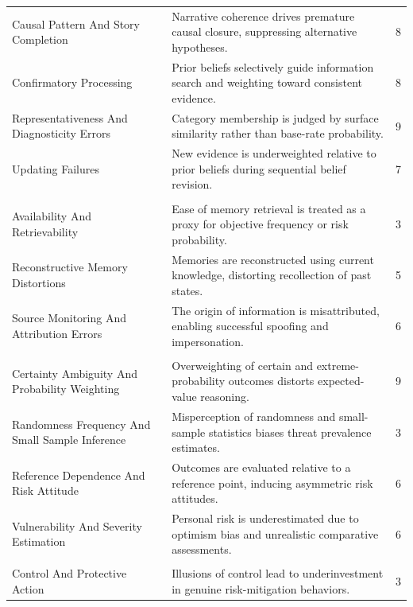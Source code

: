 \begin{longtable}{p{}@{\hspace{20pt}}p{}r}
Causal Pattern And Story Completion & Narrative coherence drives premature causal closure, suppressing alternative hypotheses. & 8 \\
Confirmatory Processing & Prior beliefs selectively guide information search and weighting toward consistent evidence. & 8 \\
Representativeness And Diagnosticity Errors & Category membership is judged by surface similarity rather than base-rate probability. & 9 \\
Updating Failures & New evidence is underweighted relative to prior beliefs during sequential belief revision. & 7 \\
\addlinespace[2pt]\multicolumn{3}{@{}l}{\textbf{Memory \& Source} ($n_{\mathrm{clusters}}=3$, $n_{\mathrm{biases}}=14$)} \\
Availability And Retrievability & Ease of memory retrieval is treated as a proxy for objective frequency or risk probability. & 3 \\
Reconstructive Memory Distortions & Memories are reconstructed using current knowledge, distorting recollection of past states. & 5 \\
Source Monitoring And Attribution Errors & The origin of information is misattributed, enabling successful spoofing and impersonation. & 6 \\
\addlinespace[2pt]\multicolumn{3}{@{}l}{\textbf{Risk \& Probability} ($n_{\mathrm{clusters}}=4$, $n_{\mathrm{biases}}=24$)} \\
Certainty Ambiguity And Probability Weighting & Overweighting of certain and extreme-probability outcomes distorts expected-value reasoning. & 9 \\
Randomness Frequency And Small Sample Inference & Misperception of randomness and small-sample statistics biases threat prevalence estimates. & 3 \\
Reference Dependence And Risk Attitude & Outcomes are evaluated relative to a reference point, inducing asymmetric risk attitudes. & 6 \\
Vulnerability And Severity Estimation & Personal risk is underestimated due to optimism bias and unrealistic comparative assessments. & 6 \\
\addlinespace[2pt]\multicolumn{3}{@{}l}{\textbf{Temporal \& Commitment} ($n_{\mathrm{clusters}}=4$, $n_{\mathrm{biases}}=17$)} \\
Control And Protective Action & Illusions of control lead to underinvestment in genuine risk-mitigation behaviors. & 3 \\

\end{longtable}
